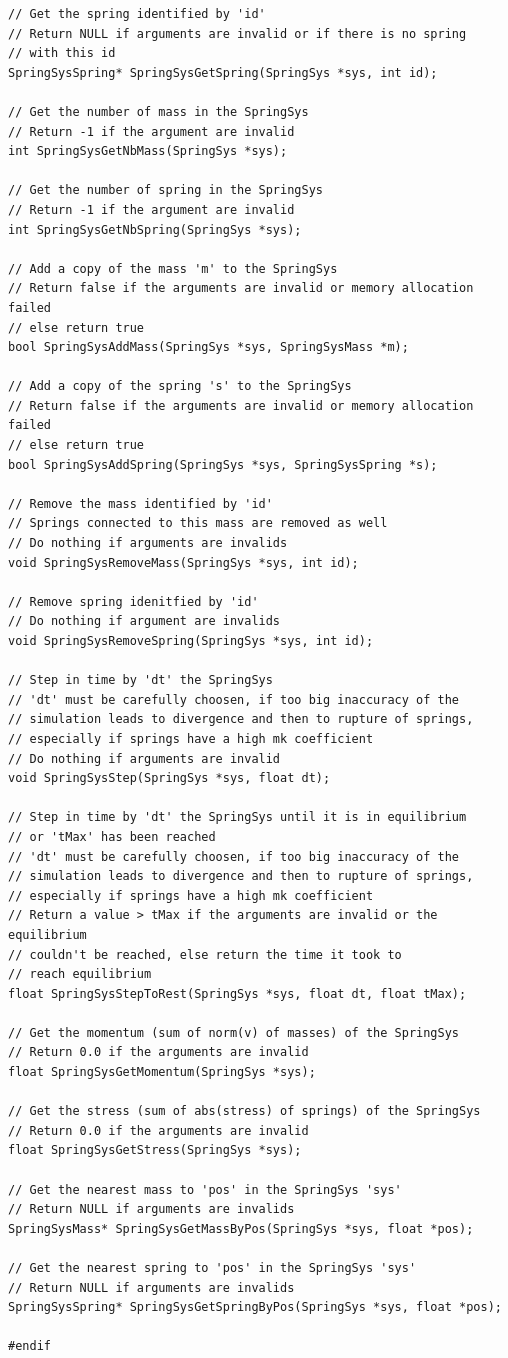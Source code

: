 \documentclass[12pt, a4paper]{article}
\begin{document}
\begin{scriptsize}
\begin{ttfamily}
\begin{lstlisting}
// Get the spring identified by 'id'
// Return NULL if arguments are invalid or if there is no spring 
// with this id
SpringSysSpring* SpringSysGetSpring(SpringSys *sys, int id);

// Get the number of mass in the SpringSys
// Return -1 if the argument are invalid
int SpringSysGetNbMass(SpringSys *sys);

// Get the number of spring in the SpringSys
// Return -1 if the argument are invalid
int SpringSysGetNbSpring(SpringSys *sys);

// Add a copy of the mass 'm' to the SpringSys
// Return false if the arguments are invalid or memory allocation failed
// else return true
bool SpringSysAddMass(SpringSys *sys, SpringSysMass *m);

// Add a copy of the spring 's' to the SpringSys
// Return false if the arguments are invalid or memory allocation failed
// else return true
bool SpringSysAddSpring(SpringSys *sys, SpringSysSpring *s);

// Remove the mass identified by 'id'
// Springs connected to this mass are removed as well
// Do nothing if arguments are invalids
void SpringSysRemoveMass(SpringSys *sys, int id);

// Remove spring idenitfied by 'id'
// Do nothing if argument are invalids
void SpringSysRemoveSpring(SpringSys *sys, int id);

// Step in time by 'dt' the SpringSys
// 'dt' must be carefully choosen, if too big inaccuracy of the 
// simulation leads to divergence and then to rupture of springs,
// especially if springs have a high mk coefficient 
// Do nothing if arguments are invalid
void SpringSysStep(SpringSys *sys, float dt);

// Step in time by 'dt' the SpringSys until it is in equilibrium 
// or 'tMax' has been reached
// 'dt' must be carefully choosen, if too big inaccuracy of the 
// simulation leads to divergence and then to rupture of springs,
// especially if springs have a high mk coefficient 
// Return a value > tMax if the arguments are invalid or the equilibrium
// couldn't be reached, else return the time it took to 
// reach equilibrium 
float SpringSysStepToRest(SpringSys *sys, float dt, float tMax);

// Get the momentum (sum of norm(v) of masses) of the SpringSys
// Return 0.0 if the arguments are invalid
float SpringSysGetMomentum(SpringSys *sys);

// Get the stress (sum of abs(stress) of springs) of the SpringSys
// Return 0.0 if the arguments are invalid
float SpringSysGetStress(SpringSys *sys);

// Get the nearest mass to 'pos' in the SpringSys 'sys'
// Return NULL if arguments are invalids
SpringSysMass* SpringSysGetMassByPos(SpringSys *sys, float *pos);

// Get the nearest spring to 'pos' in the SpringSys 'sys'
// Return NULL if arguments are invalids
SpringSysSpring* SpringSysGetSpringByPos(SpringSys *sys, float *pos);

#endif
\end{lstlisting}
\end{ttfamily}
\end{scriptsize}
\end{document}
